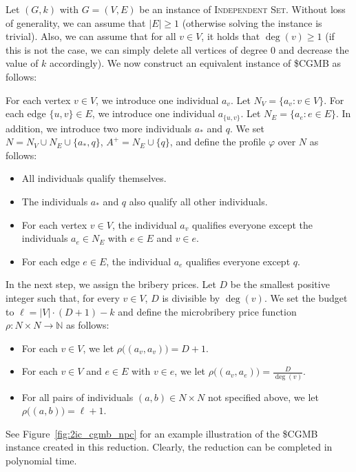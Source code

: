 \documentclass[
    12pt,               %
    a4paper,            %
    bibtotoc,           %
    pointlessnumbers,   %
    ngerman,            %
    titlepage,          %
    leqno,              %
    ]{scrarticle}       %
\newcommand\figref{Figure~\ref}
\begin{document}
\begin{Proof}
Let $(G, k)$ with $G = (V, E)$ be an instance of \textsc{Independent Set}. Without loss of generality, we can assume that $|E| \geq 1$ (otherwise solving the instance is trivial). Also, we can assume that for all $v \in V$, it holds that $\operatorname{deg}(v) \geq 1$ (if this is not the case, we can simply delete all vertices of degree $0$ and decrease the value of $k$ accordingly). We now construct an equivalent instance of \$CGMB as follows:

For each vertex $v \in V$, we introduce one individual $a_v$. Let $N_V = \{ a_v : v \in V \}$. For each edge $\{u, v\} \in E$, we introduce one individual $a_{\{u, v\}}$. Let $N_E = \{ a_e : e \in E \}$. In addition, we introduce two more individuals $a_\ast$ and $q$. We set $N = N_V \cup N_E \cup \{ a_\ast, q \}$, $A^+ = N_E \cup \{q\}$, and define the profile $\varphi$ over $N$ as follows:

\begin{itemize}[nolistsep]
\item
All individuals qualify themselves.
\item
The individuals $a_\ast$ and $q$ also qualify all other individuals.
\item
For each vertex $v \in V$, the individual $a_v$ qualifies everyone except the individuals $a_e \in N_E$ with $e \in E$ and $v \in e$.
\item
For each edge $e \in E$, the individual $a_e$ qualifies everyone except $q$.
\end{itemize}

In the next step, we assign the bribery prices. Let $D$ be the smallest positive integer such that, for every $v \in V$, $D$ is divisible by $\operatorname{deg}(v)$. We set the budget to $\ell = |V| \cdot (D + 1) - k$ and define the microbribery price function $\rho : N \times N \rightarrow \mathbb{N}$ as follows:

\begin{itemize}[nolistsep]
\item
For each $v \in V$, we let $\rho\big((a_v, a_v)\big) = D + 1$.
\item
For each $v \in V$ and $e \in E$ with $v \in e$, we let $\rho\big((a_v, a_e)\big) = \frac{D}{\operatorname{deg}(v)}$.
\item
For all pairs of individuals $(a, b) \in N \times N$ not specified above, we let $\rho\big((a, b)\big) = \ell + 1$.
\end{itemize}

See \figref{fig:2ic_cgmb_npc} for an example illustration of the \$CGMB instance created in this reduction. Clearly, the reduction can be completed in polynomial time.




\end{Proof}
\end{document}
